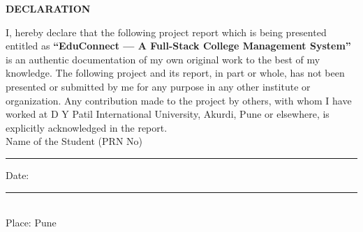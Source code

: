 \newpage

\begin{center}
  \textbf{\large \bf{DECLARATION}}  
\end{center}
\hline
{}
\vspace{0.5cm}
I, hereby declare that the following project report which is being presented entitled as \textbf{``EduConnect --- A Full-Stack College Management System''} is an authentic documentation of my own original work to the best of my knowledge. The following project and its report, in part or whole, has not been presented or submitted by me for any purpose in any other institute or organization. Any contribution made to the project by others, with whom I have worked at D Y Patil International University, Akurdi, Pune or elsewhere, is explicitly acknowledged in the report.\\[0.50cm]

\vskip 1mm
  {\bf}
Name of the Student \hspace{2cm}(PRN No) \hspace{0.9cm}  \rule{0.3\textwidth}{1pt}
\vskip 1mm

\vspace{1cm}
Date: \rule{0.2\textwidth}{0.5pt}\\
Place: Pune
